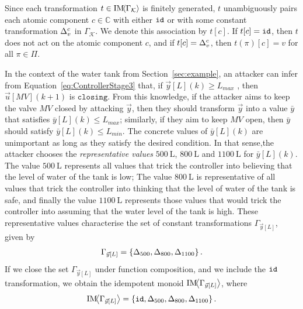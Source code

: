 {\begin{definition}
Since each transformation $t\in \text{IM}\!{{\left<\Gamma_{\mathcal{K}}\right>}}$ is finitely generated, $t$ unambiguously pairs each atomic component $c\in \mathbb{C}$ with either ${\texttt{id}}$ or with some constant transformation ${\Delta}^{c}_{v}$ in $\Gamma_{\mathcal{K}}$.  We denote this association by $t[c]$. If $t[c]={\texttt{id}}$, then $t$ does not act on the atomic component $c$, and if $t[c]={\Delta}^{c}_{v}$, then $t(\pi)[c]=v$ for all $\pi \in \Pi$.
\end{definition}
\begin{example}
  In the context of the water tank from Section~\ref{sec:example}, an attacker can infer from Equation~\ref{eq:ControllerStage3} that, if $\vec{y}[L](k)\geq L_{max}$%
  , then $\vec{u}[MV](k+1)$ is $\texttt{closing}$. From this knowledge, if the attacker aims to keep the valve $MV$ closed by attacking $\vec{y}$, then they should transform $\vec{y}$ into a value $\bar{y}$ that satisfies $\bar{y}[L](k)\leq L_{max}$; similarly, if they aim to keep $MV$ open, then $\bar{y}$ should satisfy $\bar{y}[L](k)\leq L_{min}$. The concrete values of $\bar{y}[L](k)$ are unimportant as long as they satisfy the desired condition. In that sense,the attacker chooses the \emph{representative values} $500~\mathrm{L}$, $800~\mathrm{L}$ and $1100~\mathrm{L}$ for $\bar{y}[L](k)$. The value $500~\mathrm{L}$ represents all values that trick the controller into believing that the level of water of the tank is low; The value $800~\mathrm{L}$ is representative of all values that trick the controller into thinking that the level of water of the tank is safe, and finally the value  $1100~\mathrm{L}$ represents those values that would trick the controller into assuming that the water level of the tank is high.  
  These representative values characterise the set of constant transformations $\Gamma_{\vec{y}[L]}$, given by
\begin{align}
  \Gamma_{\vec{y}[L]}=\left\{{\Delta}_{500}, {\Delta}_{800},  {\Delta}_{1100}\right\}.
\end{align}
If we close the set $\Gamma_{\vec{y}[L]}$ under function composition, and we include the ${\texttt{id}}$ transformation, we obtain the idempotent monoid $\text{IM}\!{{\left<\Gamma_{\vec{y}[L]}\right>}}$, where 
\begin{align*}
  \text{IM}\!{{\left<\Gamma_{\vec{y}[L]}\right>}} =\left\{{\texttt{id}}, {\Delta}_{500}, {\Delta}_{800},{\Delta}_{1100}\right\}.
\end{align*} 
\end{example}

}
